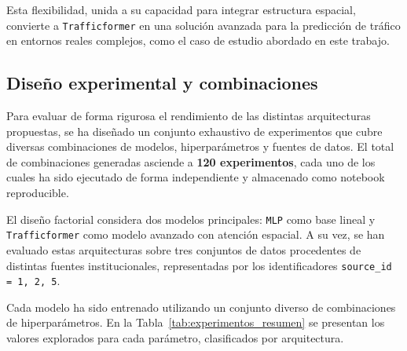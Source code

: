 Esta flexibilidad, unida a su capacidad para integrar estructura espacial, convierte a \texttt{Trafficformer} en una solución avanzada para la predicción de tráfico en entornos reales complejos, como el caso de estudio abordado en este trabajo.

\subsection{Diseño experimental y combinaciones}
\label{sec:diseño_exp_combinaciones}

Para evaluar de forma rigurosa el rendimiento de las distintas arquitecturas propuestas, se ha diseñado un conjunto exhaustivo de experimentos que cubre diversas combinaciones de modelos, hiperparámetros y fuentes de datos. El total de combinaciones generadas asciende a \textbf{120 experimentos}, cada uno de los cuales ha sido ejecutado de forma independiente y almacenado como notebook reproducible.

El diseño factorial considera dos modelos principales: \texttt{MLP} como base lineal y \texttt{Trafficformer} como modelo avanzado con atención espacial. A su vez, se han evaluado estas arquitecturas sobre tres conjuntos de datos procedentes de distintas fuentes institucionales, representadas por los identificadores \texttt{source\_id = 1, 2, 5}.

Cada modelo ha sido entrenado utilizando un conjunto diverso de combinaciones de hiperparámetros. En la Tabla~\ref{tab:experimentos_resumen} se presentan los valores explorados para cada parámetro, clasificados por arquitectura.

